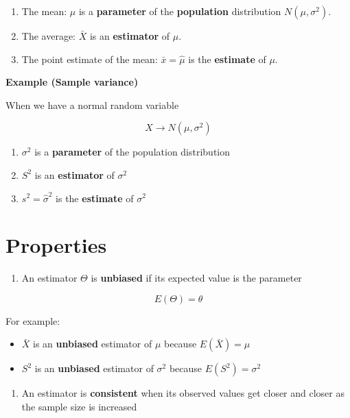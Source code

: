 \documentclass[
]{book}
\providecommand{\tightlist}{%
  \setlength{\itemsep}{0pt}\setlength{\parskip}{0pt}}
\begin{document}
\begin{enumerate}
\def\labelenumi{\arabic{enumi}.}
\tightlist
\item
  The mean: \(\mu\) is a \textbf{parameter} of the \textbf{population} distribution \(N(\mu, \sigma^2)\).
\item
  The average: \(\bar{X}\) is an \textbf{estimator} of \(\mu\).
\item
  The point estimate of the mean: \(\bar{x}=\hat{\mu}\) is the \textbf{estimate} of \(\mu\).
\end{enumerate}

\textbf{Example (Sample variance)}

When we have a normal random variable

\[X \rightarrow N(\mu, \sigma^2)\]

\begin{enumerate}
\def\labelenumi{\arabic{enumi}.}
\tightlist
\item
  \(\sigma^2\) is a \textbf{parameter} of the population distribution
\item
  \(S^2\) is an \textbf{estimator} of \(\sigma^2\)
\item
  \(s^2=\hat{\sigma}^2\) is the \textbf{estimate} of \(\sigma^2\)
\end{enumerate}

\hypertarget{properties}{%
\section{Properties}\label{properties}}

\begin{enumerate}
\def\labelenumi{\arabic{enumi}.}
\tightlist
\item
  An estimator \(\Theta\) is \textbf{unbiased} if its expected value is the parameter
\end{enumerate}

\[E(\Theta)=\theta\]

For example:

\begin{itemize}
\item
  \(\bar{X}\) is an \textbf{unbiased} estimator of \(\mu\) because \(E(\bar{X})=\mu\)
\item
  \(S^2\) is an \textbf{unbiased} estimator of \(\sigma^2\) because \(E(S^2)=\sigma^2\)
\end{itemize}

\begin{enumerate}
\def\labelenumi{\arabic{enumi}.}
\setcounter{enumi}{1}
\tightlist
\item
  An estimator is \textbf{consistent} when its observed values get closer and closer as the sample size is increased
\end{enumerate}
\end{document}
